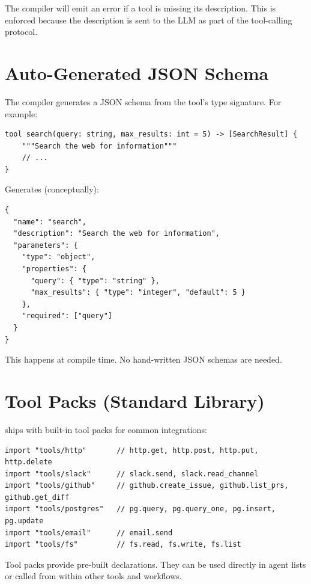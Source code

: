 \begin{note}
The compiler will emit an error if a tool is missing its description. This is enforced because the description is sent to the LLM as part of the tool-calling protocol.
\end{note}

\section{Auto-Generated JSON Schema}

The compiler generates a JSON schema from the tool's type signature. For example:

\begin{lstlisting}
tool search(query: string, max_results: int = 5) -> [SearchResult] {
    """Search the web for information"""
    // ...
}
\end{lstlisting}

Generates (conceptually):

\begin{lstlisting}[language={}]
{
  "name": "search",
  "description": "Search the web for information",
  "parameters": {
    "type": "object",
    "properties": {
      "query": { "type": "string" },
      "max_results": { "type": "integer", "default": 5 }
    },
    "required": ["query"]
  }
}
\end{lstlisting}

This happens at compile time. No hand-written JSON schemas are needed.

\section{Tool Packs (Standard Library)}

\haira{} ships with built-in tool packs for common integrations:

\begin{lstlisting}
import "tools/http"       // http.get, http.post, http.put, http.delete
import "tools/slack"      // slack.send, slack.read_channel
import "tools/github"     // github.create_issue, github.list_prs, github.get_diff
import "tools/postgres"   // pg.query, pg.query_one, pg.insert, pg.update
import "tools/email"      // email.send
import "tools/fs"         // fs.read, fs.write, fs.list
\end{lstlisting}

Tool packs provide pre-built  declarations. They can be used directly in agent  lists or called from within other tools and workflows.

